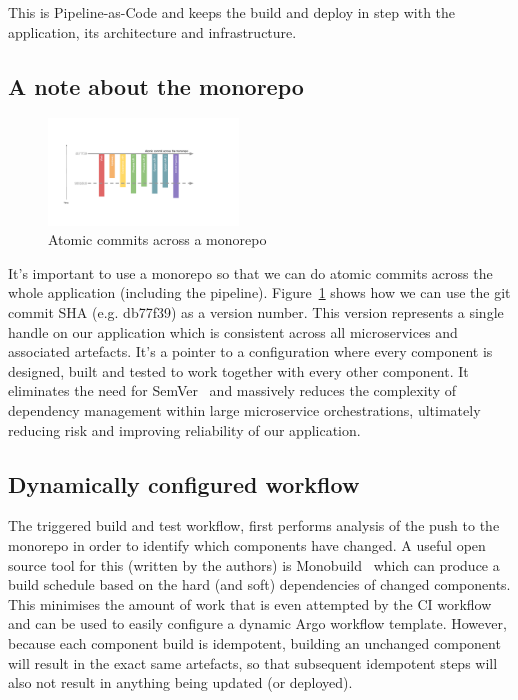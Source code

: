 \documentclass[reprint,amsmath,amssymb,aps]{revtex4-1}
\begin{document}
This is Pipeline-as-Code and keeps the build and deploy in step with the application, its architecture and infrastructure.

\subsection{\label{sec:monorepo}A note about the monorepo}

\begin{figure}[b]
	\includegraphics[width=0.45\textwidth]{figs/monorepo}
	\caption{Atomic commits across a monorepo}
	\label{fig:monorepo}
\end{figure}

It’s important to use a monorepo so that we can do atomic commits across the whole application (including the pipeline). Figure~\ref{fig:monorepo} shows how we can use the git commit SHA (e.g. db77f39) as a version number. This version represents a single handle on our application which is consistent across all microservices and associated artefacts. It’s a pointer to a configuration where every component is designed, built and tested to work together with every other component. It eliminates the need for SemVer~\cite{Semantic13:online} and massively reduces the complexity of dependency management within large microservice orchestrations, ultimately reducing risk and improving reliability of our application.

\subsection{\label{sec:dynamicworkflow}Dynamically configured workflow}

The triggered build and test workflow, first performs analysis of the push to the monorepo in order to identify which components have changed. A useful open source tool for this (written by the authors) is Monobuild~\cite{charypar24:online} which can produce a build schedule based on the hard (and soft) dependencies of changed components. This minimises the amount of work that is even attempted by the CI workflow and can be used to easily configure a dynamic Argo workflow template. However, because each component build is idempotent, building an unchanged component will result in the exact same artefacts, so that subsequent idempotent steps will also not result in anything being updated (or deployed).
\end{document}
